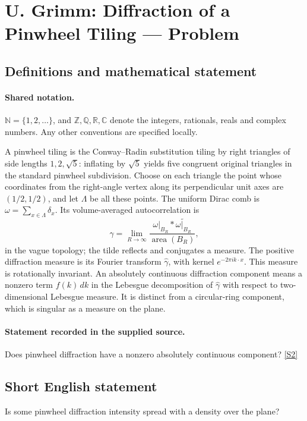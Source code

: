 \documentclass[11pt]{article}
\newcommand{\sref}[2]{\hyperlink{source:#1:#2}{[S#2]}}
\begin{document}
\section{U. Grimm: Diffraction of a Pinwheel Tiling — Problem}\label{statement}

\subsection{Definitions and mathematical statement}

\paragraph{Shared notation.}$\mathbb N=\{1,2,\ldots\}$, and $\mathbb Z,\mathbb Q,\mathbb R,\mathbb C$ denote the integers, rationals, reals and complex numbers. Any other conventions are specified locally.


A pinwheel tiling is the Conway--Radin substitution tiling by right triangles of side lengths $1,2,\sqrt5$: inflating by $\sqrt5$ yields five congruent original triangles in the standard pinwheel subdivision. Choose on each triangle the point whose coordinates from the right-angle vertex along its perpendicular unit axes are $(1/2,1/2)$, and let $\Lambda$ be all these points. The uniform Dirac comb is $\omega=\sum_{x\in\Lambda}\delta_x$. Its volume-averaged autocorrelation is
\[\gamma=\lim_{R\to\infty}\frac{\omega|_{B_R}*\widetilde{\omega|_{B_R}}}{\operatorname{area}(B_R)},\]
in the vague topology; the tilde reflects and conjugates a measure. The positive diffraction measure is its Fourier transform $\widehat\gamma$, with kernel $e^{-2\pi i k\cdot x}$. This measure is rotationally invariant. An absolutely continuous diffraction component means a nonzero term $f(k)\,dk$ in the Lebesgue decomposition of $\widehat\gamma$ with respect to two-dimensional Lebesgue measure. It is distinct from a circular-ring component, which is singular as a measure on the plane.
\paragraph{Statement recorded in the supplied source.}
Does pinwheel diffraction have a nonzero absolutely continuous component? \sref{statement}{2}
\subsection{Short English statement}
Is some pinwheel diffraction intensity spread with a density over the plane?
\end{document}
